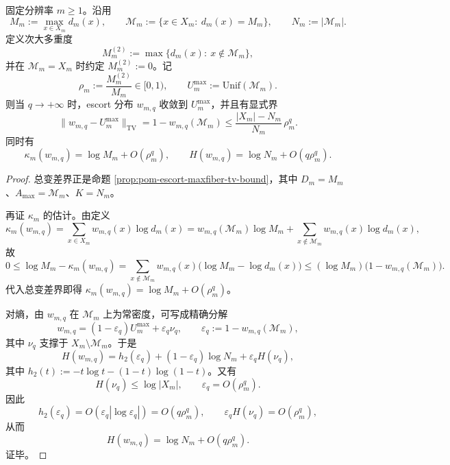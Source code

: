 \begin{theorem}\label{thm:pom-finite-zero-temp-escort-uniform-maxfiber}
固定分辨率 \(m\ge 1\)。沿用
\[
M_m:=\max_{x\in X_m}d_m(x),
\qquad
\mathcal M_m:=\{x\in X_m:\ d_m(x)=M_m\},
\qquad
N_m:=|\mathcal M_m|.
\]
定义次大多重度
\[
M_m^{(2)}:=\max\{d_m(x):\ x\notin \mathcal M_m\},
\]
并在 \(\mathcal M_m=X_m\) 时约定 \(M_m^{(2)}:=0\)。记
\[
\rho_m:=\frac{M_m^{(2)}}{M_m}\in[0,1),
\qquad
U_m^{\max}:=\mathrm{Unif}(\mathcal M_m).
\]
则当 \(q\to+\infty\) 时，escort 分布 \(w_{m,q}\) 收敛到 \(U_m^{\max}\)，并且有显式界
\[
\|w_{m,q}-U_m^{\max}\|_{\mathrm{TV}}
=1-w_{m,q}(\mathcal M_m)
\le
\frac{|X_m|-N_m}{N_m}\,\rho_m^q.
\]
同时有
\[
\kappa_m(w_{m,q})=\log M_m+O(\rho_m^q),
\qquad
H(w_{m,q})=\log N_m+O(q\rho_m^q).
\]
\end{theorem}
\begin{proof}
总变差界正是命题 \ref{prop:pom-escort-maxfiber-tv-bound}，其中 \(D_m=M_m\)、\(A_{\max}=\mathcal M_m\)、\(K=N_m\)。

再证 \(\kappa_m\) 的估计。由定义
\[
\kappa_m(w_{m,q})
=\sum_{x\in X_m}w_{m,q}(x)\log d_m(x)
=w_{m,q}(\mathcal M_m)\log M_m+\sum_{x\notin\mathcal M_m}w_{m,q}(x)\log d_m(x),
\]
故
\[
0\le \log M_m-\kappa_m(w_{m,q})
=\sum_{x\notin\mathcal M_m}w_{m,q}(x)\bigl(\log M_m-\log d_m(x)\bigr)
\le (\log M_m)\bigl(1-w_{m,q}(\mathcal M_m)\bigr).
\]
代入总变差界即得
\(
\kappa_m(w_{m,q})=\log M_m+O(\rho_m^q)
\)。

对熵，由 \(w_{m,q}\) 在 \(\mathcal M_m\) 上为常密度，可写成精确分解
\[
w_{m,q}=(1-\varepsilon_q)U_m^{\max}+\varepsilon_q\nu_q,
\qquad
\varepsilon_q:=1-w_{m,q}(\mathcal M_m),
\]
其中 \(\nu_q\) 支撑于 \(X_m\setminus\mathcal M_m\)。于是
\[
H(w_{m,q})
=h_2(\varepsilon_q)+(1-\varepsilon_q)\log N_m+\varepsilon_q H(\nu_q),
\]
其中 \(h_2(t):=-t\log t-(1-t)\log(1-t)\)。又有
\[
H(\nu_q)\le \log|X_m|,
\qquad
\varepsilon_q=O(\rho_m^q).
\]
因此
\[
h_2(\varepsilon_q)=O(\varepsilon_q|\log\varepsilon_q|)=O(q\rho_m^q),
\qquad
\varepsilon_q H(\nu_q)=O(\rho_m^q),
\]
从而
\[
H(w_{m,q})=\log N_m+O(q\rho_m^q).
\]
证毕。
\end{proof}

